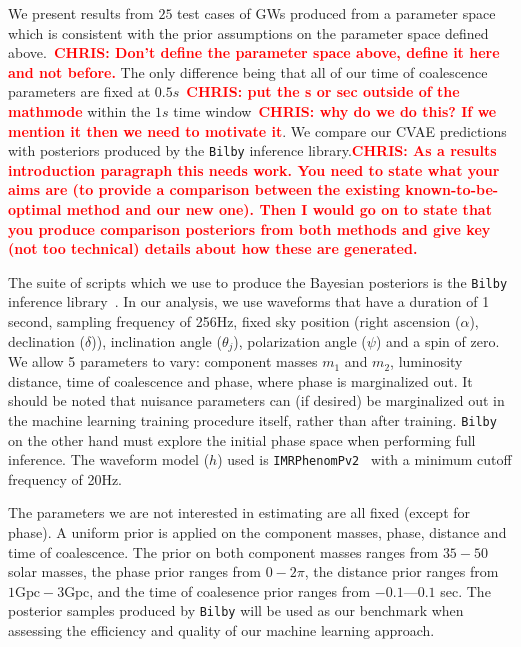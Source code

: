 \documentclass[%
showpacs,
 amsmath,amssymb,
 aps,
 twocolumn,
 prl,
 reprint,
floatfix,
]{revtex4-1}
\newcommand{\chris}[1]{\textbf{\textcolor{red}{CHRIS: #1}}}
\begin{document}
%
%
We present results from $25$ test cases of \acp{GW} produced from a parameter space
which is consistent with the prior assumptions on the parameter space defined
above.~\chris{Don't define the parameter space above, define it here and not
before.} The only difference being that all of our time of coalescence
parameters are fixed at $0.5s$~\chris{put the s or sec outside of the mathmode}
within the $1s$ time window~\chris{why do we do this? If we mention it then we
need to motivate it}. We compare our \ac{CVAE} predictions with posteriors
produced by the \texttt{Bilby} inference library.\chris{As a results
introduction paragraph this needs work. You need to state what your aims are
(to provide a comparison between the existing known-to-be-optimal method and
our new one). Then I would go on to state that you produce comparison
posteriors from both methods and give key (not too technical) details about how
these are generated.}


%
%
The suite of scripts which we use to produce the Bayesian
posteriors is the \texttt{Bilby} inference library~\cite{1811.02042}. In our
analysis, we use waveforms that have a duration of 1 second, sampling frequency
of 256Hz, fixed sky position (right ascension ($\alpha$), declination ($\delta$)), inclination angle ($\theta_j$), polarization angle ($\psi$) and a spin of zero.
We allow 5 parameters to vary: component masses $m_1$ and $m_2$, luminosity
distance, time of coalescence and phase, where phase is marginalized
out. It should be noted that nuisance parameters can (if desired) be 
marginalized out in the machine learning training procedure itself, rather 
than after training. \texttt{Bilby} on the other hand must explore the initial 
phase space when performing full inference. The waveform
model ($h$) used is
\texttt{IMRPhenomPv2}~\cite{1809.10113} with a minimum cutoff frequency of
20Hz.

%
%
The parameters we are not interested in estimating are all fixed (except for
phase). A uniform prior is applied on the component masses, phase, distance and
time of coalescence. The prior on both component masses ranges from $35 - 50$
solar masses, the phase prior ranges from $0 - 2\pi$, the distance prior ranges
from $1\textrm{Gpc} - 3\textrm{Gpc}$, and the time of coalesence prior ranges
from $-0.1$---$0.1$ sec. The posterior samples produced by \texttt{Bilby} will
be used as our benchmark when assessing the efficiency and quality of our machine learning approach.
\end{document}
